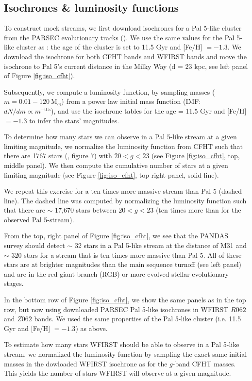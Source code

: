 \documentclass[twocolumn]{aastex62}
\newcommand{\msun}{\textrm{M}_\odot}
\begin{document}
\subsection{Isochrones \& luminosity functions}
\label{sec:lum}
To construct mock streams, we first download isochrones for a Pal 5-like cluster from the PARSEC evolutionary tracks (\citealt{bressan12}). We use the same values for the Pal 5-like cluster as \citet{ibata17}: the age of the cluster is set to 11.5 Gyr and [Fe/H] $= -1.3$. We download the isochrone for both CFHT bands and WFIRST bands and move the isochrone to Pal 5's current distance in the Milky Way (d = 23 kpc, see left panel of Figure \ref{fig:iso_cfht}). 

Subsequently, we compute a luminosity function, by sampling masses ($m = 0.01 - 120 ~\msun$) from a power law initial mass function (IMF: $dN/dm \propto m^{-0.5}$), and use the isochrone tables for the age = 11.5 Gyr and [Fe/H] $= -1.3$ to infer the stars' magnitudes. 

To determine how many stars we can observe in a Pal 5-like stream at a given limiting magnitude, we normalize the luminosity function from CFHT such that there are 1767 stars (\citealt{ibata16}, figure 7) with $20 < g < 23$ (see Figure \ref{fig:iso_cfht}, top, middle panel). We then compute the cumulative number of stars at a given limiting magnitude (see Figure \ref{fig:iso_cfht}, top right panel, solid line).

We repeat this exercise for a ten times more massive stream than Pal 5 (dashed line). The dashed line was computed by normalizing the luminosity function such that there are $\sim$ 17,670 stars between $20 < g < 23$ (ten times more than for the observed Pal 5-stream). 

From the top, right panel of Figure \ref{fig:iso_cfht}, we see that the PANDAS survey should detect $\sim$ 32 stars in a Pal 5-like stream at the distance of M31 and $\sim$ 320 stars for a stream that is ten times more massive than Pal 5. All of these stars are at brighter magnitudes than the main sequence turnoff (see left panel) and are in the red giant branch (RGB) or more evolved stellar evolutionary stages. 

In the bottom row of Figure \ref{fig:iso_cfht}, we show the same panels as in the top row, but now using downloaded PARSEC Pal 5-like isochrones in WFIRST $R062$ and $Z062$ bands. We used the same properties of the Pal 5-like cluster (i.e. 11.5 Gyr and [Fe/H] $= -1.3$) as above. 

To estimate how many stars WFIRST should be able to observe in a Pal 5-like stream, we normalized the luminosity function by sampling the exact same initial masses in the dowloaded WFIRST isochrone as for the $g$-band CFHT masses. This yields the number of stars WFIRST will observe at a given magnitude. 
\end{document}
